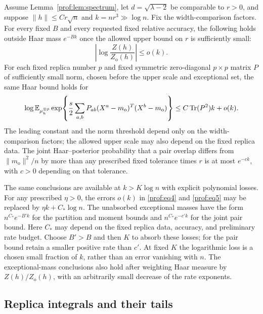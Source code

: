 \begin{proposition}
\label{prof:prop:unconstrained}
Assume Lemma~\ref{prof:lem:spectrum}, let $d=\sqrt{\lambda-2}$ be
comparable to $r>0$, and suppose $\|h\|\le Cr\sqrt n$ and
$k=nr^3\gg\log n$. Fix the width-comparison factors. For every fixed
$B$ and every requested fixed relative accuracy, the following holds
outside Haar mass $e^{-Bk}$ once the allowed upper bound on $r$ is
sufficiently small:
\begin{equation}\label{prof:eq4}
 \left|\log\frac{Z(h)}{Z_{\mathrm o}(h)}\right|\le o(k).
\end{equation}
For each fixed replica number $p$ and fixed symmetric zero-diagonal
$p\times p$ matrix $P$ of sufficiently small norm, chosen before the
upper scale and exceptional set, the same Haar bound holds for
\begin{equation}\label{prof:eq5}
 \log\mathbb E_{\mu_h^{\otimes p}}
 \exp\!\left\{
 \frac{s}{2}\sum_{a,b}P_{ab}(X^a-m_{\mathrm o})^T(X^b-m_{\mathrm o})
 \right\}
 \le C\operatorname{Tr}(P^2)k+o(k).
\end{equation}
The leading constant and the norm threshold depend only on the
width-comparison factors; the allowed upper scale may also depend on
the fixed replica data. The joint Haar--posterior probability that
a pair overlap differs from $\|m_{\mathrm o}\|^2/n$ by more than any
prescribed fixed tolerance times $r$ is at most $e^{-ck}$, with $c>0$
depending on that tolerance.

The same conclusions are available at $k>K\log n$ with explicit
polynomial losses. For any prescribed $\eta>0$, the errors $o(k)$ in
\eqref{prof:eq4} and \eqref{prof:eq5} may be replaced by
$\eta k+C_*\log n$. The unabsorbed exceptional masses have the form
$n^{C_*}e^{-B'k}$ for the partition and moment bounds and
$n^{C_*}e^{-c'k}$ for the joint pair bound. Here $C_*$ may depend on
the fixed replica data, accuracy, and preliminary rate budget.
Choose $B'>B$ and then $K$ to absorb these losses; for the pair bound
retain a smaller positive rate than $c'$. At fixed $K$ the logarithmic
loss is a chosen small fraction of $k$, rather than an error vanishing
with $n$. The exceptional-mass conclusions
also hold after weighting Haar measure by $Z(h)/Z_{\mathrm o}(h)$,
with an arbitrarily small decrease of the rate exponents.
\end{proposition}

\subsection{Replica integrals and their tails}
\label{prof:subsec:replica-integrals}

